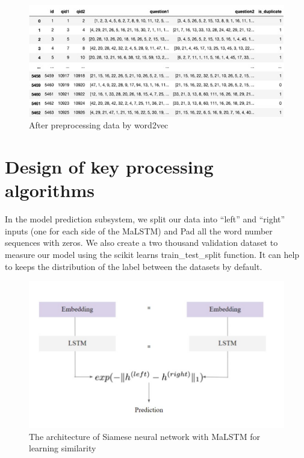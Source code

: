 \documentclass[12pt,oneside,openright,a4paper]{cpe-english-project}
\begin{document}
\begin{figure}[!h]
	\includegraphics[width=14cm]{img/ch3/After preprocessing data by word2vec.jpg}
	\caption{After preprocessing data by word2vec}\label{fig:After preprocessing data by word2vec}
\end{figure}

\section{Design of key processing algorithms}
\begin{flushleft}
In the model prediction subsystem, we split our data into “left” and “right” inputs (one for each side of the MaLSTM) and Pad all the word number sequences with zeros. We also create a two thousand validation dataset to measure our model using the scikit learns train\_test\_split function. It can help to keeps the distribution of the label between the datasets by default.
\end{flushleft}

\pagebreak

\begin{figure}[!h]
	\includegraphics[width=14cm]{img/ch3/The architecture of Siamese neural network with MaLSTM for learning similarity.jpg}
	\caption{The architecture of Siamese neural network with MaLSTM for learning similarity}\label{fig:The architecture of Siamese neural network with MaLSTM for learning similarity}
\end{figure}
\end{document}

